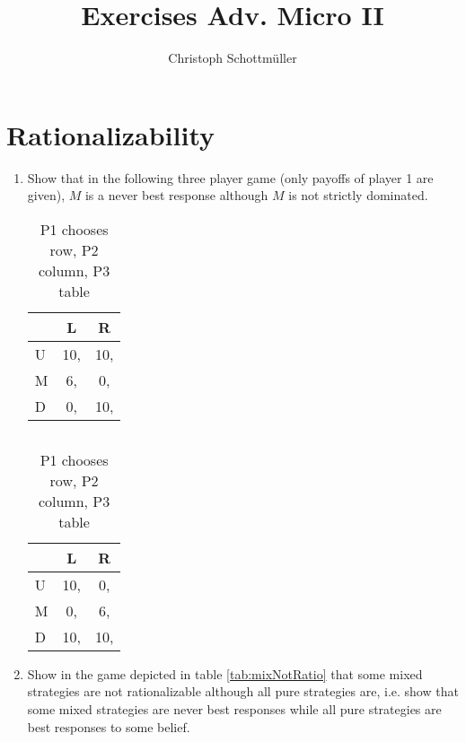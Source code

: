 \documentclass[a4paper,12pt]{article}
\title{Exercises Adv. Micro II}
\author{Christoph Schottm\"uller}
\begin{document}
\maketitle

\section{Rationalizability}
\begin{enumerate}
\item   Show that in the following three player game (only payoffs of player 1 are given), $M$ is a never best response although $M$ is not strictly dominated.
\begin{table}[h]
    \centering
    \begin{tabular}{l|c|c}
      & L &R\\ \hline
      U& 10,  &10, \\
      M&6,  &0, \\
      D& 0, & 10,
    \end{tabular}
    $\qquad$
    \begin{tabular}{l|c|c}
      & L &R\\ \hline
      U& 10,  &0,  \\
      M&0,&6, \\
      D& 10, & 10,
    \end{tabular}
    \caption{P1 chooses row, P2 column, P3 table}
    \label{tab:domVsRatio}
  \end{table}
\item Show in the game depicted in table \ref{tab:mixNotRatio} that some mixed strategies are not rationalizable although all pure strategies are, i.e. show that some mixed strategies are never best responses while all pure strategies are best responses to some belief.
    \begin{table}[h]
    \centering
    \begin{tabular}{l|c|c}

\end{tabular}
\end{table}
\end{enumerate}
\end{document}
